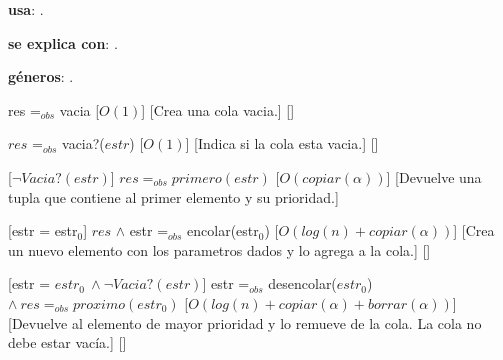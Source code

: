 \begin{Interfaz}

  \textbf{usa}: .
  
  \textbf{se explica con}: .

  \textbf{g\'eneros}: .


  {res =$_{obs}$ vacia}%
  [$O(1)$]
  [Crea una cola vacia.]
  []

  {$res$ =$_{obs}$ vacia?($estr$)}%
  [$O(1)$]
  [Indica si la cola esta vacia.]
  []

  [$\neg Vacia?(estr)$]
  {$res =_{obs} primero(estr)$}%
  [$O(copiar(\alpha))$]
  [Devuelve una tupla que contiene al primer elemento y su prioridad.]
  

  [estr = estr$_0$]
  {$res$ $\wedge$ estr =$_{obs}$ encolar(estr$_0$)}%
  [$O(log(n) + copiar(\alpha))$]
  [Crea un nuevo elemento con los parametros dados y lo agrega a la cola.]
  []

  [estr = $estr_0 \ \wedge \neg Vacia?(estr)$] 
  {estr =$_{obs}$ desencolar($estr_0$) $\wedge \ res =_{obs} proximo(estr_0)$}%
  [$O(log(n) + copiar(\alpha) + borrar(\alpha))$]
  [Devuelve al elemento de mayor prioridad y lo remueve de la cola. La cola no debe estar vac\'ia.]
  []
  
  
\end{Interfaz}
